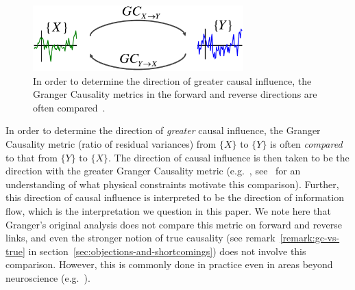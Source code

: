 \documentclass[letterpaper, 10pt, conference]{ieeeconf}
\begin{document}

\begin{figure}[htbp] %
	\centering
	\includegraphics[width=3.2in]{gc-comparison}
	\caption{In order to determine the direction of greater causal influence, the Granger Causality metrics in the forward and reverse directions are often compared~\cite{Roebroeck2005MappingDirected}.}
	\label{fig:gc-comparison}
\end{figure}

In order to determine the direction of \emph{greater} causal influence, the Granger Causality metric (ratio of residual variances) from $\{X\}$ to $\{Y\}$ is often \emph{compared} to that from $\{Y\}$ to $\{X\}$. The direction of causal influence is then taken to be the direction with the greater Granger Causality metric (e.g.~\cite{Brovelli2004BetaOscillations, Roebroeck2005MappingDirected, jiao2013universal}, see~\cite{Roebroeck2005MappingDirected} for an understanding of what physical constraints motivate this comparison). Further, this direction of causal influence is interpreted to be the direction of information flow, which is the interpretation we question in this paper. We note here that Granger's original analysis does not compare this metric on forward and reverse links, and even the stronger notion of true causality (see remark~\ref{remark:gc-vs-true} in section~\ref{sec:objections-and-shortcomings}) does not involve this comparison. However, this is commonly done in practice even in areas beyond neuroscience (e.g.~\cite{Brovelli2004BetaOscillations, Roebroeck2005MappingDirected, jiao2013universal, hesse2003use}).
\end{document}
